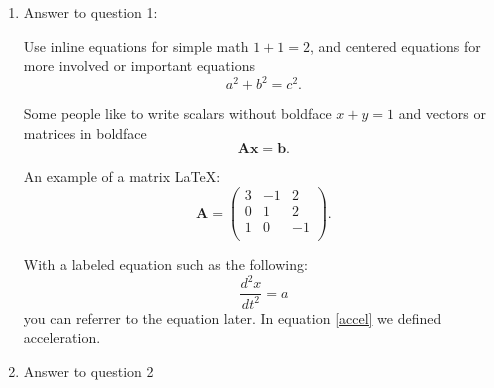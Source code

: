 \documentclass[11pt]{article}
\begin{document}
\begin{enumerate}

\item
Answer to question 1:

Use inline equations for simple math $1+1=2$, and centered equations for more involved or important equations
\begin{equation}
    a^2 + b^2 = c^2.
\end{equation}

Some people like to write scalars without boldface $x+y=1$ and vectors or matrices in boldface
\begin{equation}
    \mathbf{A} \mathbf{x} = \mathbf{b}.
\end{equation}

An example of a matrix \LaTeX:
\begin{equation}
    \mathbf{A} = \left(
    \begin{array}{ccc}
    3 & -1 & 2 \\ 	
    0 & 1 & 2 \\ 
    1 & 0 & -1 \\
\end{array} 
\right).  
\end{equation}

With a labeled equation such as the following:
\begin{equation}
    \label{accel}
    \frac{d^2 x}{d t^2} = a
\end{equation}
you can referrer to the equation later. In equation \ref{accel} we defined acceleration.


\item
Answer to question 2


\end{enumerate}
\end{document}
